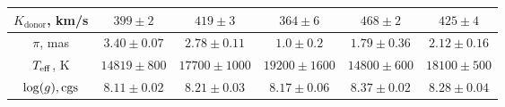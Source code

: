\begin{landscape}
\begin{table}
\begin{tabular}{cccccc}
            $K_\mathrm{donor}$, km/s   & $399\pm2$               & $419\pm3$                & $364\pm6$                 & $468\pm2$                 & $425\pm4$ \\
            \hline
            $\pi$, mas                 & $3.40\pm0.07$           & $2.78\pm0.11$            & $1.0\pm0.2$               & $1.79\pm0.36$             & $2.12\pm0.16$ \\
            $T_{\rm eff}$, K           & $14819\pm800$           & $17700\pm1000$           & $19200\pm1600$            & $14800\pm600$             & $18100\pm500$ \\
            $\log(g), {\rm cgs}$       & $8.11\pm0.02$           & $8.21\pm0.03$            & $8.17\pm0.06$             & $8.37\pm0.02$             & $8.28\pm0.04$ \\
            \hline
            \hline
        \end{tabular}
    \end{table}


\end{landscape}
